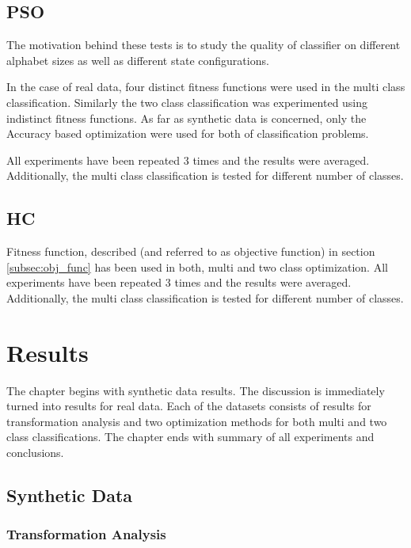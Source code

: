 \documentclass{mini}
\begin{document}
\section{PSO}
The motivation behind these tests is to study the quality of classifier on different alphabet sizes as well as different state configurations. 

In the case of real data, four distinct fitness functions were used in the multi class classification. Similarly the two class classification was experimented using indistinct fitness functions. As far as synthetic data is concerned, only the Accuracy based optimization were used for both of classification problems.

All experiments have been repeated $3$ times and the results were averaged. Additionally, the multi class classification is tested for different number of classes. 
\section{HC}
Fitness function, described (and referred to as objective function) in section \ref{subsec:obj_func} has been used in both, multi and two class optimization. All experiments have been repeated $3$ times and the results were averaged. Additionally, the multi class classification is tested for different number of classes.


\chapter{Results}\label{chap:results}

The chapter begins with synthetic data results. The discussion is immediately turned into results for real data. Each of the datasets consists of results for transformation analysis and two optimization methods for both multi and two class classifications. The chapter ends with summary of all experiments and conclusions.

\section{Synthetic Data}

\subsection{Transformation Analysis}
\end{document}
